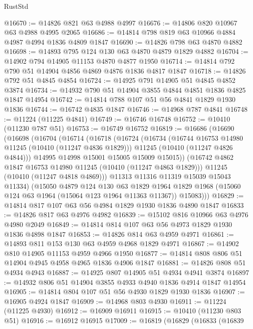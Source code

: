 \begin{lexlean}{RustStd}
\begin{coremodule}
@16670 := @14826 @821 @63 @4988 @4997
@16676 := @14806 @820 @10967 @63 @4988 @4995 @2065
@16686 := @14814 @798 @819 @63 @10966 @4884 @4987 @4994 @1836 @4809 @1847
@16690 := @14826 @798 @63 @4870 @4882
@16698 := @14893 @795 @124 @130 @63 @4870 @4879 @1829 @4882
@16704 := @14902 @794 @14905 @11153 @4870 @4877 @1950
@16714 := @14814 @792 @790 @51 @14904 @4856 @4869 @4876 @1836 @4817 @1847
@16718 := @14826 @792 @51 @4845 @4854
@16724 := @14925 @791 @14905 @51 @4845 @4852 @3874
@16734 := @14932 @790 @51 @14904 @3855 @4844 @4851 @1836 @4825 @1847 @14954
@16742 := @14814 @788 @107 @51 @56 @4841 @1829 @1930 @1836
@16744 := @16742 @4835 @1847
@16746 := @14968 @787 @4841
@16748 := @11224 (@11225 @4841)
@16749 := @16746 @16748
@16752 := @10410 (@11230 @787 @51)
@16753 := @16749 @16752
@16819 := @16686
    (@16690
      (@16698
        (@16704
          (@16714
            (@16718
              (@16724
                (@16734
                  (@16744 @16753 @14980 @11245 (@10410 (@11247 @4836 @1829)))
                  @11245
                  (@10410 (@11247 @4826 @4844)))
                @14995
                @14998
                @15001
                @15005
                @15009
                @15015))
            (@16742 @4862 @1847 @16753 @14980 @11245 (@10410 (@11247 @4863 @1829)))
            @11245
            (@10410 (@11247 @4818 @4869)))
          @11313
          @11316
          @11319
          @15039
          @15043
          @11334)
        (@15050
          @4879
          @124
          @130
          @63
          @1829
          @1964
          @1829
          @1968
          (@15060 @124 @63 @1964 (@15064 @123 @1964 @11363 @11367))
          @15083)))
@16829 := @14814 @817 @107 @63 @56 @4984 @1829 @1930 @1836 @4890 @1847
@16833 := @14826 @817 @63 @4976 @4982
@16839 := @15102 @816 @10966 @63 @4976 @4980 @2049
@16849 := @14814 @814 @107 @63 @56 @4973 @1829 @1930 @1836 @4898 @1847
@16853 := @14826 @814 @63 @4959 @4971
@16861 := @14893 @811 @153 @130 @63 @4959 @4968 @1829 @4971
@16867 := @14902 @810 @14905 @11153 @4959 @4966 @1950
@16877 := @14814 @808 @806 @51 @14904 @4945 @4958 @4965 @1836 @4906 @1847
@16881 := @14826 @808 @51 @4934 @4943
@16887 := @14925 @807 @14905 @51 @4934 @4941 @3874
@16897 := @14932 @806 @51 @14904 @3855 @4933 @4940 @1836 @4914 @1847 @14954
@16905 := @14814 @804 @107 @51 @56 @4930 @1829 @1930 @1836
@16907 := @16905 @4924 @1847
@16909 := @14968 @803 @4930
@16911 := @11224 (@11225 @4930)
@16912 := @16909 @16911
@16915 := @10410 (@11230 @803 @51)
@16916 := @16912 @16915
@17009 := @16819
    (@16829
      (@16833
        (@16839

\end{coremodule}
\end{lexlean}
